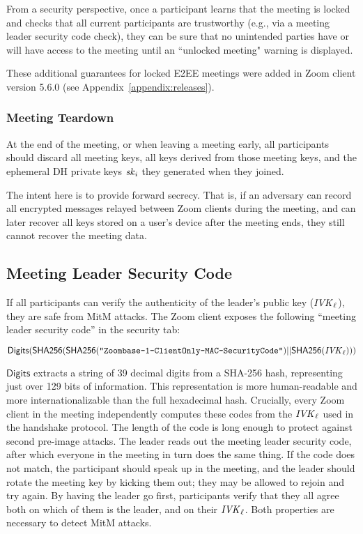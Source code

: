 From a security perspective, once a participant learns that the meeting is locked and checks that
all current participants are trustworthy (e.g., via a meeting leader security code check), they can
be sure that no unintended parties have or will have access to the meeting until an ``unlocked
meeting" warning is displayed. 

These additional guarantees for locked E2EE meetings were added in Zoom client version 5.6.0 (see
Appendix~\ref{appendix:releases}).

\subsubsection{Meeting Teardown}
At the end of the meeting, or when leaving a meeting early, all participants should discard all
meeting keys, all keys derived from those meeting keys, and the ephemeral DH private keys $\mathit{sk}_i$
they generated when they joined.

The intent here is to provide forward secrecy. That is, if an adversary can record all encrypted
messages relayed between Zoom clients during the meeting, and can later recover all keys stored on a
user's device after the meeting ends, they still cannot recover the meeting data.

\subsection{Meeting Leader Security Code}\label{subsec:securitycode} If all participants can verify
the authenticity of the leader's public key ($\mathit{IVK}_{\ell}$), they are safe from MitM attacks. The
Zoom client exposes the following ``meeting leader security code'' in the security tab:

$$\mathsf{Digits}({\sf SHA256}({\sf SHA256}(\texttt{"Zoombase-1-ClientOnly-MAC-SecurityCode"}) ||
{\sf SHA256}(\mathit{IVK}_{\ell})))$$

$\mathsf{Digits}$ extracts a string of 39 decimal digits from a SHA-256 hash, representing just over
129 bits of information. This representation is more human-readable and more internationalizable
than the full hexadecimal hash. Crucially, every Zoom client in the meeting independently computes
these codes from the $\mathit{IVK}_{\ell}$ used in the handshake protocol. The length of the code is long
enough to protect against second pre-image attacks. The leader reads out the meeting leader security
code, after which everyone in the meeting in turn does the same thing. If the code does not match,
the participant should speak up in the meeting, and the leader should rotate the meeting key by
kicking them out; they may be allowed to rejoin and try again. By having the leader go first,
participants verify that they all agree both on which of them is the leader, and on their
$\mathit{IVK}_{\ell}$. Both properties are necessary to detect MitM attacks.

